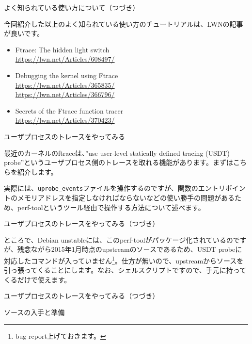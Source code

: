 \begin{frame}[containsverbatim]{よく知られている使い方について（つづき）}

  今回紹介した以上のよく知られている使い方のチュートリアルは、LWNの記事が良いです。\\

\begin{itemize}
\item Ftrace: The hidden light switch\\
\url{https://lwn.net/Articles/608497/}
\item Debugging the kernel using Ftrace\\
\url{https://lwn.net/Articles/365835/}\\
\url{https://lwn.net/Articles/366796/}
\item Secrets of the Ftrace function tracer\\
\url{https://lwn.net/Articles/370423/}
\end{itemize}  
  
\end{frame}  

\begin{frame}[containsverbatim]{ユーザプロセスのトレースをやってみる}

  最近のカーネルのftraceは、''use user-level statically defined tracing (USDT) probe''というユーザプロセス側のトレースを取れる機能があります。まずはこちらを紹介します。

  実際には、\verb+uprobe_events+ファイルを操作するのですが、関数のエントリポイントのメモリアドレスを指定しなければならないなどの使い勝手の問題があるため、perf-toolというツール経由で操作する方法について述べます。

\end{frame}  

\begin{frame}{ユーザプロセスのトレースをやってみる（つづき）}

 ところで、Debian unstableには、このperf-toolがパッケージ化されているのですが、残念ながら2015年1月時点のupstreamのソースであるため、USDT probeに対応したコマンドが入っていません\footnote{bug report上げておきます。}。仕方が無いので、upstreamからソースを引っ張ってくることにします。なお、シェルスクリプトですので、手元に持ってくるだけで使えます。
  
\end{frame}  

\begin{frame}[containsverbatim]{ユーザプロセスのトレースをやってみる（つづき）}

 ソースの入手と準備
 \end{frame}  

